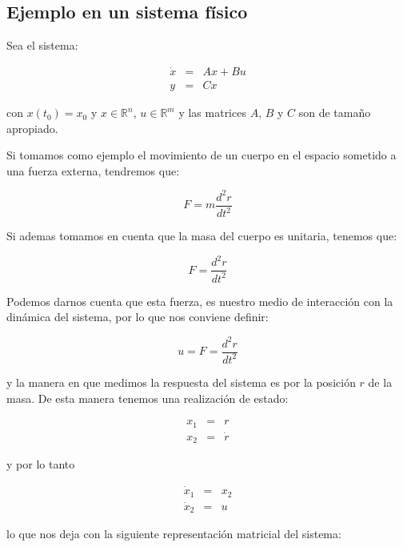 	\subsection{Ejemplo en un sistema físico}

		Sea el sistema:

		\begin{eqnarray*}
			\dot{x} & = & A x + B u \\
			y & = & C x
		\end{eqnarray*}

		con $x(t_0) = x_0$ y $x \in \mathbb{R}^n$, $u \in \mathbb{R}^m$ y las matrices $A$, $B$ y $C$ son de tamaño apropiado.

		Si tomamos como ejemplo el movimiento de un cuerpo en el espacio sometido a una fuerza externa, tendremos que:

		\begin{equation*}
			F = m \frac{d^2 r}{dt^2}
		\end{equation*}

		Si ademas tomamos en cuenta que la masa del cuerpo es unitaria, tenemos que:

		\begin{equation*}
			F = \frac{d^2 r}{dt^2}
		\end{equation*}

		Podemos darnos cuenta que esta fuerza, es nuestro medio de interacción con la dinámica del sistema, por lo que nos conviene definir:

		\begin{equation*}
			u = F = \frac{d^2 r}{dt^2}
		\end{equation*}

		y la manera en que medimos la respuesta del sistema es por la posición $r$ de la masa.
		De esta manera tenemos una realización de estado:

		\begin{eqnarray*}
			x_1 & = & r \\
			x_2 & = & \dot{r}
		\end{eqnarray*}

		y por lo tanto

		\begin{eqnarray*}
			\dot{x}_1 & = & x_2 \\
			\dot{x}_2 & = & u
		\end{eqnarray*}

		lo que nos deja con la siguiente representación matricial del sistema:

